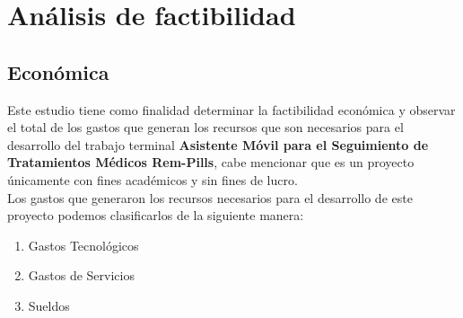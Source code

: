 %	
%
%	
%	
%	
%	
%	

\section{Análisis de factibilidad}
\subsection{Económica}

Este estudio tiene como finalidad determinar la factibilidad económica y observar el total de los gastos que generan los recursos que son necesarios para el desarrollo del trabajo terminal \textbf{ Asistente Móvil para el Seguimiento de Tratamientos Médicos Rem-Pills}, cabe mencionar que es un proyecto únicamente con fines académicos y sin fines de lucro.\\

Los gastos que generaron los recursos necesarios para el desarrollo de este proyecto podemos clasificarlos de la siguiente manera:

\begin{enumerate}
	\item Gastos Tecnológicos
	\item Gastos de Servicios
	\item Sueldos
\end{enumerate}

